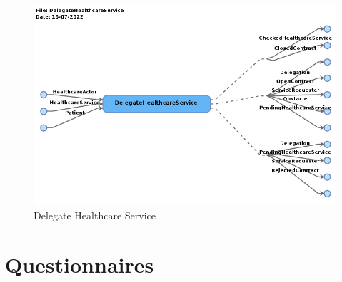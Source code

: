 \begin{figure}
    \centering
    \includegraphics[width=\textwidth]{overleaf/images/testing/DelegateHealthcareService.png}
    \caption{Delegate Healthcare Service}
    \label{appendix:fig:DelegateHealthcareService}
\end{figure}


\chapter{Questionnaires}
\label{appendix:questionnaire}


